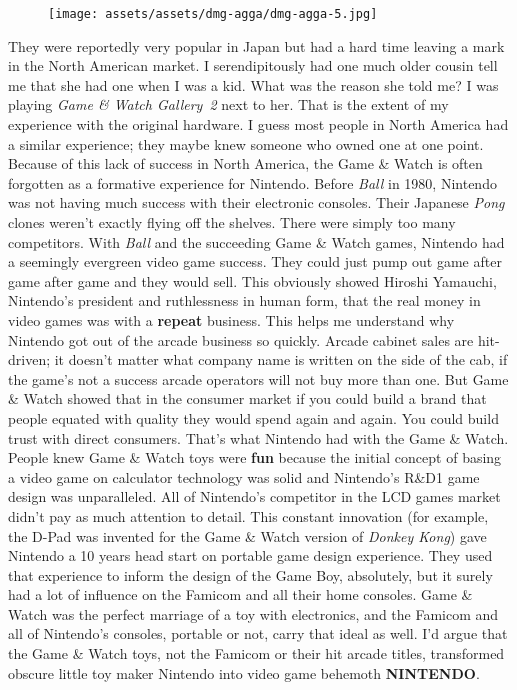 \documentclass{book}
\begin{document}
\begin{figure}[hbt]
\vskip 10pt
\centering \texttt{[image: assets/assets/dmg-agga/dmg-agga-5.jpg]}
\vskip 6pt
\end{figure}
They were reportedly very popular in Japan but had a hard time leaving a mark in the North American market. I serendipitously had one much older cousin tell me that she had one when I was a kid. What was the reason she told me? I was playing \emph{Game \& Watch Gallery~2} next to her. That is the extent of my experience with the original hardware. I guess most people in North America had a similar experience; they maybe knew someone who owned one at one point. Because of this lack of success in North America, the Game \& Watch is often forgotten as a formative experience for Nintendo. Before \emph{Ball} in 1980, Nintendo was not having much success with their electronic consoles. Their Japanese \emph{Pong} clones weren’t exactly flying off the shelves. There were simply too many competitors. With \emph{Ball} and the succeeding Game \& Watch games, Nintendo had a seemingly evergreen video game success. They could just pump out game after game after game and they would sell. This obviously showed Hiroshi Yamauchi, Nintendo’s president and ruthlessness in human form, that the real money in video games was with a \textbf{repeat} business. This helps me understand why Nintendo got out of the arcade business so quickly. Arcade cabinet sales are hit-driven; it doesn’t matter what company name is written on the side of the cab, if the game’s not a success arcade operators will not buy more than one. But Game \& Watch showed that in the consumer market if you could build a brand that people equated with quality they would spend again and again. You could build trust with direct consumers. That’s what Nintendo had with the Game \& Watch. People knew Game \& Watch toys were \textbf{fun} because the initial concept of basing a video game on calculator technology was solid and Nintendo’s R\&D1 game design was unparalleled. All of Nintendo’s competitor in the LCD games market didn’t pay as much attention to detail. This constant innovation (for example, the D-Pad was invented for the Game \& Watch version of \emph{Donkey Kong}) gave Nintendo a 10 years head start on portable game design experience. They used that experience to inform the design of the Game Boy, absolutely, but it surely had a lot of influence on the Famicom and all their home consoles. Game \& Watch was the perfect marriage of a toy with electronics, and the Famicom and all of Nintendo’s consoles, portable or not, carry that ideal as well. I’d argue that the Game \& Watch toys, not the Famicom or their hit arcade titles, transformed obscure little toy maker Nintendo into video game behemoth \textbf{NINTENDO}.
\end{document}
